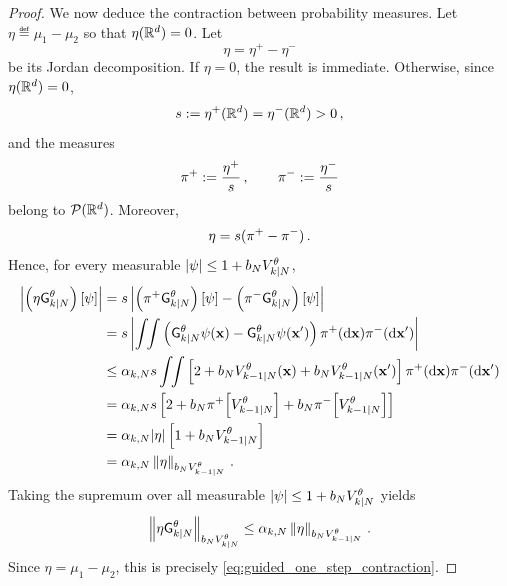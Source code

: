 \documentclass[11pt]{article}
\theoremstyle{plain}
\theoremstyle{definition}
\theoremstyle{remark}
\begin{document}
\begin{proof}
We now deduce the contraction between probability measures. Let $\eta\eqdef\mu_1-\mu_2$ so that $\eta(\mathbb{R}^d)=0$. Let
$$
\eta=\eta^+-\eta^-
$$
be its Jordan decomposition. If $\eta=0$, the result is immediate.
Otherwise, since $\eta(\mathbb{R}^d)=0$,
$$
s := \eta^+(\mathbb{R}^d) = \eta^-(\mathbb{R}^d) > 0 \,,
$$
and the measures
$$
\pi^+:=\frac{\eta^+}{s} \,, \qquad \pi^-:=\frac{\eta^-}{s}
$$
belong to $\mathcal P(\mathbb{R}^d)$. Moreover,
$$
\eta=s(\pi^+-\pi^-) \,.
$$
Hence, for every measurable $|\psi|\le1+b_N\twistedlyap{k}{N}[\theta]$,
\begin{align*}
\left| \left(\eta\fsmk{k}{N}[\theta]\right)[\psi] \right|
&= s \left| \left(\pi^+\fsmk{k}{N}[\theta]\right)[\psi] - \left(\pi^-\fsmk{k}{N}[\theta]\right)[\psi] \right| \\
&= s\left| \int\!\!\int \left( \fsmk{k}{N}[\theta]\psi(\x) - \fsmk{k}{N}[\theta]\psi(\x') \right) \pi^+(\rmd\x)\pi^-(\rmd\x') \right| \\
& \le \alpha_{k,N}s \int\!\!\int \left[ 2+ b_N \twistedlyap{k-1}{N}[\theta](\x) + b_N \twistedlyap{k-1}{N}[\theta](\x') \right] \pi^+(\rmd\x)\pi^-(\rmd\x') \\
&= \alpha_{k,N}s \left[ 2 + b_N \pi^+\!\left[ \twistedlyap{k-1}{N}[\theta] \right] + b_N \pi^-\!\left[ \twistedlyap{k-1}{N}[\theta] \right] \right] \\
&= \alpha_{k,N} |\eta| \left[ 1+ b_N \twistedlyap{k-1}{N}[\theta] \right] \\
&= \alpha_{k,N} \vnorm[ \eta ][b_N \twistedlyap{k-1}{N}[\theta]] \eqsp.
\end{align*}
%
Taking the supremum over all measurable $|\psi|\le1+b_N\twistedlyap{k}{N}[\theta]$ yields
\begin{equation} \label{eq:contraction_one_step_forward}
\vnorm[ \eta\fsmk{k}{N}[\theta] ][b_N\twistedlyap{k}{N}[\theta]] \le \alpha_{k,N} \vnorm[ \eta ][b_N\twistedlyap{k-1}{N}[\theta]] \eqsp.
\end{equation}
Since $\eta=\mu_1-\mu_2$, this is precisely \eqref{eq:guided_one_step_contraction}.
\end{proof}
\end{document}
